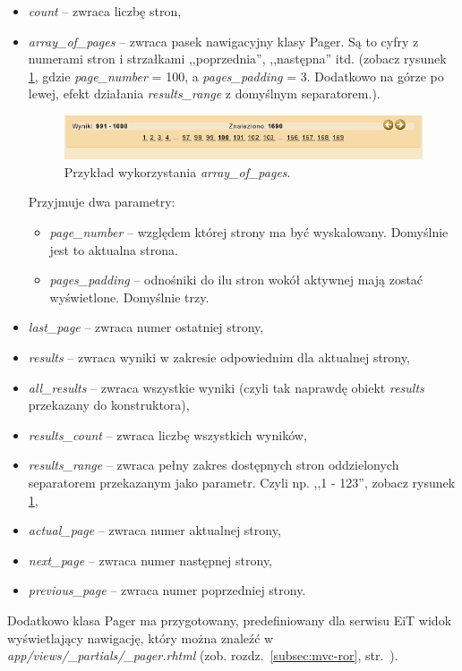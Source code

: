 \documentclass[a4paper,12pt,oneside]{report}
\begin{document}
\begin{itemize}
  \item \emph{count} -- zwraca liczbę stron,
  \item \emph{array\_of\_pages} -- zwraca pasek nawigacyjny klasy Pager. Są to cyfry z numerami stron i strzałkami ,,poprzednia'', ,,następna'' itd. (zobacz rysunek \ref{fig:array_of_pages}, gdzie \emph{page\_number} = 100, a \emph{pages\_padding} = 3. Dodatkowo na górze po lewej, efekt działania \emph{results\_range} z domyślnym separatorem.). 

\begin{figure}[h]
\centering
\includegraphics{array_of_pages.png}
\caption{Przykład wykorzystania \emph{array\_of\_pages}. \label{fig:array_of_pages}}
\end{figure}

Przyjmuje dwa parametry:
  \begin{itemize}
    \item \emph{page\_number} -- względem której strony ma być wyskalowany. Domyślnie jest to aktualna strona.
    \item \emph{pages\_padding} -- odnośniki do ilu stron wokół aktywnej mają zostać wyświetlone. Domyślnie trzy.
  \end{itemize}
  \item \emph{last\_page} -- zwraca numer ostatniej strony,
  \item \emph{results} -- zwraca wyniki w zakresie odpowiednim dla aktualnej strony,
  \item \emph{all\_results} -- zwraca wszystkie wyniki (czyli tak naprawdę obiekt \emph{results} przekazany do konstruktora),
  \item \emph{results\_count} -- zwraca liczbę wszystkich wyników,
  \item \emph{results\_range} -- zwraca pełny zakres dostępnych stron oddzielonych separatorem przekazanym jako parametr. Czyli np. ,,1 - 123'', zobacz rysunek \ref{fig:array_of_pages},
  \item \emph{actual\_page} -- zwraca numer aktualnej strony,
  \item \emph{next\_page} -- zwraca numer następnej strony,
  \item \emph{previous\_page} -- zwraca numer poprzedniej strony.
\end{itemize}
Dodatkowo klasa Pager ma przygotowany, predefiniowany dla serwisu EiT widok wyświetlający nawigację, który można znaleźć w \emph{app/views/\_partials/\_pager.rhtml} (zob. rozdz.~\ref{subsec:mvc-ror}, str.~\pageref{subsec:mvc-ror}).
\end{document}
